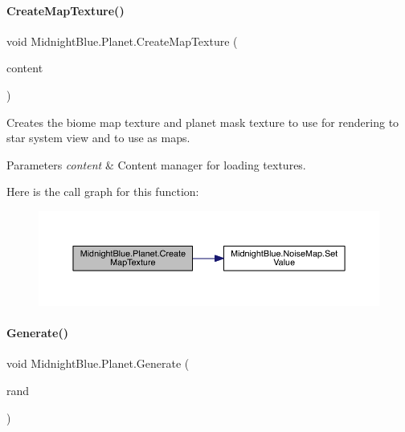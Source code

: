 \paragraph{\texorpdfstring{Create\+Map\+Texture()}{CreateMapTexture()}}
{\footnotesize\ttfamily void Midnight\+Blue.\+Planet.\+Create\+Map\+Texture (\begin{DoxyParamCaption}\item[{Content\+Manager}]{content }\end{DoxyParamCaption})\hspace{0.3cm}{\ttfamily [inline]}}



Creates the biome map texture and planet mask texture to use for rendering to star system view and to use as maps. 


\begin{DoxyParams}{Parameters}
{\em content} & Content manager for loading textures.\\
\hline
\end{DoxyParams}
Here is the call graph for this function\+:\nopagebreak
\begin{figure}[H]
\begin{center}
\leavevmode
\includegraphics[width=350pt]{class_midnight_blue_1_1_planet_ae39b013905369f01902b4f28d4fc031e_cgraph}
\end{center}
\end{figure}
\hypertarget{class_midnight_blue_1_1_planet_ac7264aea3a992afb4cab0ad99c96dbb8}{}\label{class_midnight_blue_1_1_planet_ac7264aea3a992afb4cab0ad99c96dbb8} 
\paragraph{\texorpdfstring{Generate()}{Generate()}}
{\footnotesize\ttfamily void Midnight\+Blue.\+Planet.\+Generate (\begin{DoxyParamCaption}\item[{Random}]{rand }\end{DoxyParamCaption})\hspace{0.3cm}{\ttfamily [inline]}}



